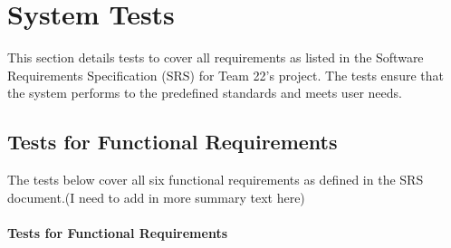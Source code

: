 \documentclass[12pt, titlepage]{article}
\begin{document}
\section{System Tests}
\label{System Tests Desc}



This section details tests to cover all requirements as listed in the
Software Requirements Specification (SRS) for Team 22's project. The
tests ensure that the system performs to the predefined standards and
meets user needs.

\subsection{Tests for Functional Requirements}

The tests below cover all six functional requirements as defined in
the SRS document.(I need to add in more summary text here)

\paragraph{Tests for Functional Requirements}
\end{document}
